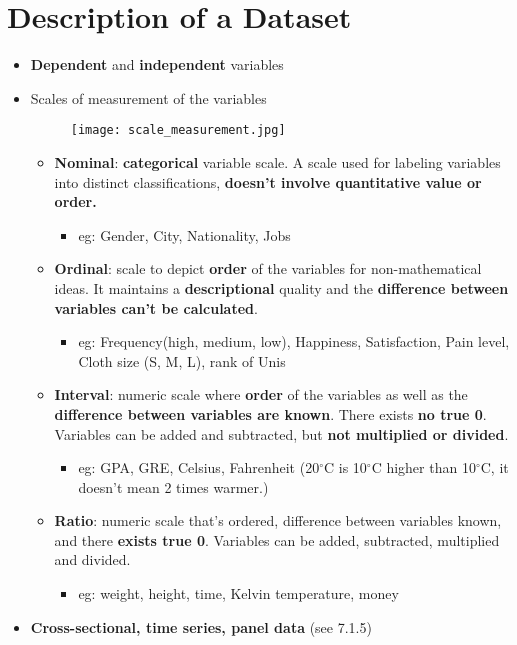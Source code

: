 \section{Description of a Dataset}
\begin{itemize}
	\item \textbf{Dependent} and \textbf{independent} variables
	\item Scales of measurement of the variables 
	\begin{figure}[H]
		\centering
		\texttt{[image: scale\_measurement.jpg]}
	\end{figure}
	\begin{itemize}
		\item \textbf{Nominal}: \textbf{categorical} variable scale. A scale used for labeling variables into distinct classifications, \textbf{doesn't involve quantitative value or order. }
		\begin{itemize}
			\item eg: Gender, City, Nationality, Jobs
		\end{itemize}
		\item \textbf{Ordinal}: scale to depict \textbf{order} of the variables for non-mathematical ideas. It maintains a \textbf{descriptional} quality and the \textbf{difference between variables can't be calculated}. 
		\begin{itemize}
			\item eg: Frequency(high, medium, low), Happiness, Satisfaction, Pain level, Cloth size (S, M, L), rank of Unis
		\end{itemize}
		\item \textbf{Interval}: numeric scale where \textbf{order} of the variables as well as the \textbf{difference between variables are known}. There exists \textbf{no true 0}. Variables can be added and subtracted, but \textbf{not multiplied or divided}. 
		\begin{itemize}
			\item eg: GPA, GRE, Celsius, Fahrenheit (20$^\circ$C is 10$^\circ$C higher than 10$^\circ$C, it doesn't mean 2 times warmer.)
		\end{itemize}
		\item \textbf{Ratio}: numeric scale that's ordered, difference between variables known, and there \textbf{exists true 0}. Variables can be added, subtracted, multiplied and divided.
		\begin{itemize}
			\item eg: weight, height, time, Kelvin temperature, money
		\end{itemize}
	\end{itemize}
	\item \textbf{Cross-sectional, time series, panel data} (see 7.1.5)
\end{itemize}



